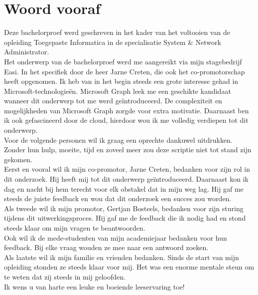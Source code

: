 
\chapter*{Woord vooraf}%
\label{ch:voorwoord}


Deze bachelorproef werd geschreven in het kader van het voltooien van de opleiding Toegepaste Informatica in de specialisatie System \& Network Administrator. \\

Het onderwerp van de bachelorproef werd me aangereikt via mijn stagebedrijf Easi. In het specifiek door de heer Jarne Creten, die ook het co-promotorschap heeft opgenomen. Ik heb van in het begin steeds een grote interesse gehad in Microsoft-technologieën. Microsoft Graph leek me een geschikte kandidaat wanneer dit onderwerp tot me werd geïntroduceerd. De complexiteit en mogelijkheden van Microsoft Graph zorgde voor extra motivatie. Daarnaast ben ik ook gefascineerd door de cloud, hierdoor wou ik me volledig verdiepen tot dit onderwerp. \\

Voor de volgende personen wil ik graag een oprechte dankuwel uitdrukken. Zonder hun hulp, moeite, tijd en zoveel meer zou deze scriptie niet tot stand zijn gekomen. \\

Eerst en vooral wil ik mijn co-promotor, Jarne Creten, bedanken voor zijn rol in dit onderzoek. Hij heeft mij tot dit onderwerp geïntroduceerd. Daarnaast kon ik dag en nacht bij hem terecht voor elk obstakel dat in mijn weg lag. Hij gaf me steeds de juiste feedback en wou dat dit onderzoek een succes zou worden. \\

Als tweede wil ik mijn promotor, Gertjan Bosteels, bedanken voor zijn sturing tijdens dit uitwerkingsproces. Hij gaf me de feedback die ik nodig had en stond steeds klaar om mijn vragen te beantwoorden. \\

Ook wil ik de mede-studenten van mijn academiejaar bedanken voor hun feedback. Bij elke vraag wouden ze mee naar een antwoord zoeken. \\

Als laatste wil ik mijn familie en vrienden bedanken. Sinds de start van mijn opleiding stonden ze steeds klaar voor mij. Het was een enorme mentale steun om te weten dat zij steeds in mij geloofden. \\

Ik wens u van harte een leuke en boeiende leeservaring toe!

